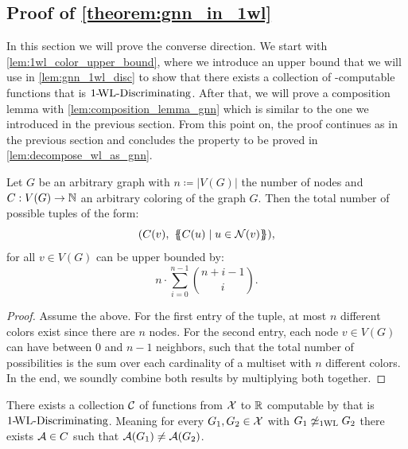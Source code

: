 \subsection{Proof of \autoref{theorem:gnn_in_1wl}}
In this section we will prove the converse direction. We start with \cref{lem:1wl_color_upper_bound}, where we introduce an upper bound that we will use in \cref{lem:gnn_1wl_disc} to show that there exists a collection of \gnn-computable functions that is $\text{1-\!WL-Discriminating}$. After that, we will prove a composition lemma with \cref{lem:composition_lemma_gnn} which is similar to the one we introduced in the previous section. From this point on, the proof continues as in the previous section and concludes the property to be proved in \cref{lem:decompose_wl_as_gnn}.

\begin{lemma}\label{lem:1wl_color_upper_bound}
    Let $G$ be an arbitrary graph with $n \coloneqq |V(G)|$ the number of nodes and $C: V(G) \rightarrow \mathbb{N}$ an arbitrary coloring of the graph $G$. Then the total number of possible tuples of the form:
    \begin{equation*}
        (C(v), \ \{\!\!\{ C(u) \mid u \in \mathcal{N}(v) \}\!\!\}),
    \end{equation*}
    for all $v \in V(G)$ can be upper bounded by:
    \begin{equation*}
        n \cdot \sum_{i=0}^{n-1} \binom{n+i -1}{i}.
    \end{equation*}
\end{lemma}

\begin{proof}
    Assume the above. For the first entry of the tuple, at most $n$ different colors exist since there are $n$ nodes. For the second entry, each node $v \in V(G)$ can have between $0$ and $n-1$ neighbors, such that the total number of possibilities is the sum over each cardinality of a multiset with $n$ different colors. In the end, we soundly combine both results by multiplying both together.
\end{proof}


\begin{lemma}\label{lem:gnn_1wl_disc}
    There exists a collection $\mathcal{C}$ of functions from $\mathcal{X}$ to $\mathbb{R}$ computable by \gnns that is $\text{1-\!WL-Discriminating}$. Meaning for every $G_1, G_2 \in \mathcal{X}$ with $G_1 \not\simeq_{\text{1WL}} G_2$ there exists $\mathcal{A} \in C$ such that $\mathcal{A}(G_1) \neq \mathcal{A}(G_2)$.
\end{lemma}

